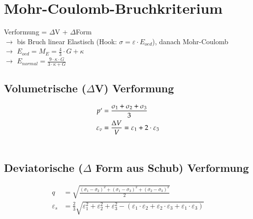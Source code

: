 \section{Mohr-Coulomb-Bruchkriterium}
	\begin{minipage}{\linewidth}
	Verformung = $\Delta$V + $\Delta$Form \\
	$\rightarrow$ bis Bruch linear Elastisch (Hook: $\sigma = \varepsilon \cdot E_{oed}$), danach Mohr-Coulomb \\
	\qquad $\rightarrow$ $E_{oed} = M_E = \frac{4}{3} \cdot G + \kappa$ \\
	\qquad $\rightarrow$ $E_{normal} = \frac{9 \cdot \kappa \cdot G}{3 \cdot \kappa + G}$
	\end{minipage}




\begin{minipage}{0.5\linewidth}
\subsection{Volumetrische ($\Delta$V) Verformung}
	\begin{align*}
		p`				&= \frac{\sigma_1 + \sigma_2 + \sigma_3}{3}	 \\
		\varepsilon_v	&= \frac{\Delta V}{V} = \varepsilon_1 + 2 \cdot \varepsilon_3 \\
		\\
	\end{align*}
\end{minipage}
\begin{minipage}{0.5\linewidth}
\subsection{Deviatorische ($\Delta$ Form aus Schub) Verformung}
	\begin{align*}
		q				&= \sqrt{\frac{(\sigma_1 - \sigma_2)^2 + (\sigma_1 - \sigma_3)^2 + (\sigma_2 - \sigma_3)^2}{2}} \\
		\varepsilon_s	&= \frac{2}{3} \sqrt{\varepsilon_1^2 + \varepsilon_2^2 + \varepsilon_3^2 - (\varepsilon_1 \cdot \varepsilon_2 + \varepsilon_2 \cdot \varepsilon_3 + \varepsilon_1 \cdot \varepsilon_3)} \\
	\end{align*}
	\end{minipage}
	
	
	
